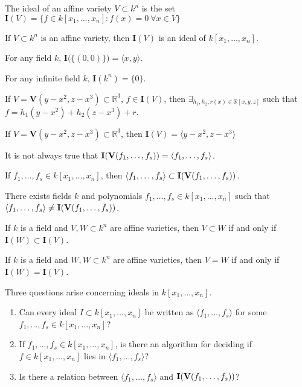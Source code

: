 \documentclass[../main.tex]{subfiles}
\begin{document}
%
\begin{definition}
The ideal of an affine variety $V \subset k^n$ is the set $\mathbf{I}(V)=\{f\in k[x_1,\hdots ,x_n]:f(x)=0\ \forall{x\in V}\}$
\end{definition}
%
\begin{theorem}
If $V\subset k^n$ is an affine variety, then $\mathbf{I}(V)$ is an ideal of $k[x_1,\hdots ,x_n]$.
\end{theorem}
%
\begin{theorem}
For any field $k$, $\mathbf{I}\big(\{(0,0)\}\big) = \langle x,y\rangle$.
\end{theorem}
%
\begin{theorem}
For any infinite field $k$, $\mathbf{I}(k^n) = \{0\}$.
\end{theorem}
%
\begin{theorem}
If $V = \mathbf{V}(y-x^2,z-x^3)\subset \mathbb{R}^3$, $f\in \mathbf{I}(V)$, then $\exists_{h_1,h_2,r(x)\in \mathbb{R}[x,y,z]}$ such that $f=h_1(y-x^2)+h_2(z-x^3)+r$.
\end{theorem}
%
\begin{theorem}
If $V = \mathbf{V}(y-x^2,z-x^3)\subset \mathbb{R}^3$, then $\mathbf{I}(V) = \langle y-x^2,z-x^3\rangle$
\end{theorem}
%
\begin{remark}
It is not always true that $\mathbf{I}(\textbf{V}(f_1,\hdots, f_s)) = \langle f_1,\hdots, f_s\rangle$.
\end{remark}
%
\begin{theorem}
If $f_1,\hdots, f_s \in k[x_1,\hdots ,x_n]$, then $\langle f_1,\hdots, f_s \rangle \subset \mathbf{I}(\textbf{V}(f_1,\hdots, f_s))$.
\end{theorem}
%
\begin{theorem}
There exists fields $k$ and polynomials $f_1,\hdots, f_s\in k[x_1,\hdots ,x_n]$ such that $\langle f_1,\hdots,f_s\rangle \ne \mathbf{I}(\textbf{V}(f_1,\hdots, f_s))$.
\end{theorem}
%
\begin{theorem}
If $k$ is a field and $V,W\subset k^n$ are affine varieties, then $V\subset W$ if and only if $\mathbf{I}(W)\subset \mathbf{I}(V)$.
\end{theorem}
%
\begin{theorem}
If $k$ is a field and $W,W\subset k^n$ are affine varieties, then $V=W$ if and only if $\mathbf{I}(W)=\mathbf{I}(V)$.
\end{theorem}
%
Three questions arise concerning ideals in $k[x_1,\hdots ,x_n]$.
\begin{enumerate}
\item Can every ideal $I\subset k[x_1,\hdots ,x_n]$ be written as $\langle f_1,\hdots, f_s\rangle$ for some $f_1,\hdots, f_s \in k[x_1,\hdots ,x_n]$?
\item If $f_1,\hdots, f_s\in k[x_1,\hdots ,x_n]$, is there an algorithm for deciding if $f\in k[x_1,\hdots ,x_n]$ lies in $\langle f_1,\hdots, f_s\rangle$?
\item Is there a relation between $\langle f_1,\hdots, f_s\rangle$ and $\mathbf{I}(\textbf{V}(f_1,\hdots, f_s))$?
\end{enumerate}
%
\end{document}
